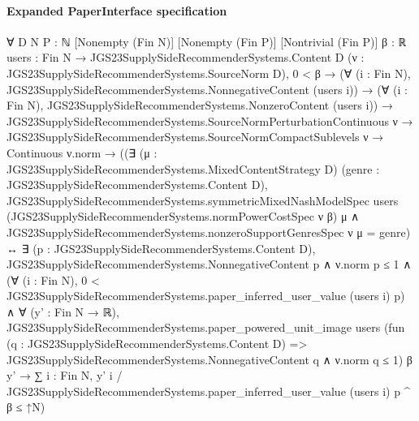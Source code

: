 \documentclass[10pt]{article}
\begin{document}
\paragraph{Expanded PaperInterface specification}
\begin{ReviewVerbatim}
∀ {D N P : ℕ} [Nonempty (Fin N)] [Nonempty (Fin P)] [Nontrivial (Fin P)] {β : ℝ}
  {users : Fin N → JGS23SupplySideRecommenderSystems.Content D} (ν : JGS23SupplySideRecommenderSystems.SourceNorm D),
  0 < β →
    (∀ (i : Fin N), JGS23SupplySideRecommenderSystems.NonnegativeContent (users i)) →
      (∀ (i : Fin N), JGS23SupplySideRecommenderSystems.NonzeroContent (users i)) →
        JGS23SupplySideRecommenderSystems.SourceNormPerturbationContinuous ν →
          JGS23SupplySideRecommenderSystems.SourceNormCompactSublevels ν →
            Continuous ν.norm →
              ((∃ (μ : JGS23SupplySideRecommenderSystems.MixedContentStrategy D) (genre :
                  JGS23SupplySideRecommenderSystems.Content D),
                  JGS23SupplySideRecommenderSystems.symmetricMixedNashModelSpec users
                      (JGS23SupplySideRecommenderSystems.normPowerCostSpec ν β) μ ∧
                    JGS23SupplySideRecommenderSystems.nonzeroSupportGenresSpec ν μ = {genre}) ↔
                ∃ (p : JGS23SupplySideRecommenderSystems.Content D),
                  JGS23SupplySideRecommenderSystems.NonnegativeContent p ∧
                    ν.norm p ≤ 1 ∧
                      (∀ (i : Fin N), 0 < JGS23SupplySideRecommenderSystems.paper_inferred_user_value (users i) p) ∧
                        ∀ (y' : Fin N → ℝ),
                          JGS23SupplySideRecommenderSystems.paper_powered_unit_image users
                              (fun (q : JGS23SupplySideRecommenderSystems.Content D) =>
                                JGS23SupplySideRecommenderSystems.NonnegativeContent q ∧ ν.norm q ≤ 1)
                              β y' →
                            ∑ i : Fin N,
                                y' i / JGS23SupplySideRecommenderSystems.paper_inferred_user_value (users i) p ^ β ≤
                              ↑N)
\end{ReviewVerbatim}
\end{document}
